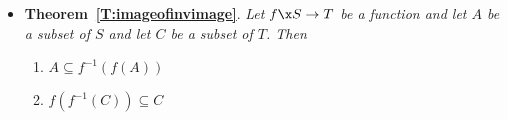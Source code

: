 \begin{itemize}
\item \textbf{Theorem~\ref{T:imageofinvimage}}.
\emph{Let $f\x S \to T$ be a function and let $A$ be a subset of $S$ and let $C$ be a subset of $T$.  Then}
\begin{multicols}{2}
\begin{enumerate}
\item $A \subseteq f^{-1} \!\left( f ( A ) \right)$

\item $f \!\left( f^{-1} ( C ) \right) \subseteq C$
\end{enumerate}
\end{multicols}

\end{itemize}

\hbreak

\endinput

